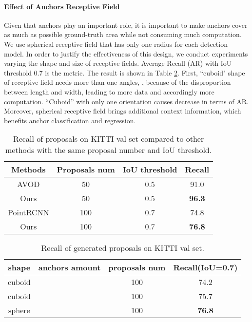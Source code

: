 \documentclass[10pt,twocolumn,letterpaper]{article}
\begin{document}
\paragraph{Effect of Anchors Receptive Field}
Given that anchors play an important role, it is important to make anchors cover as much as possible ground-truth area while not consuming much computation. We use spherical receptive field that has only one radius for each detection model. In order to justify the effectiveness of this design, we conduct  experiments varying the shape and size of receptive fields. Average Recall (AR) with IoU threshold 0.7 is the metric. The result is shown in Table \ref{tab:whether_sphere}. First, ``cuboid" shape of receptive field needs more than one angles, \ie , because of the disproportion between length and width, leading to  more data and accordingly more computation. ``Cuboid'' with only one orientation causes  decrease in terms of AR. Moreover, spherical receptive field brings additional context information, which benefits anchor classification and regression.

\begin{table}[t]
   \centering \addtolength{\tabcolsep}{-1pt}
   \footnotesize
   \begin{tabular}{|c|c|c|c|}
       \hline
       Methods & Proposals num & IoU threshold & Recall\\
       \hline
       AVOD \cite{AVOD} & 50 & 0.5 & 91.0 \\
       Ours & 50 & 0.5 & \bf 96.3 \\
       \hline
       PointRCNN \cite{shi2018pointrcnn} & 100 & 0.7 & 74.8 \\
       Ours & 100 & 0.7 & \bf 76.8 \\
      \hline
   \end{tabular}\vspace{0.1cm}
   \caption{Recall of proposals on KITTI val set compared to other methods with the same proposal number and IoU threshold.}
   \label{tab:whether_proposal}
\end{table}

\begin{table}[t]
   \centering \addtolength{\tabcolsep}{-1pt}
   \footnotesize
   \begin{tabular}{|c|c|c|c|}
       \hline
       shape & anchors amount & proposals num & Recall(IoU=0.7) \\
       \hline
       cuboid &  & 100 & 74.2 \\
       cuboid &  & 100 & 75.7 \\
       sphere &  & 100 & \bf 76.8 \\
      \hline
   \end{tabular}\vspace{0.1cm}
   \caption{Recall of generated proposals on KITTI val set.}
   \label{tab:whether_sphere}
\end{table}
\end{document}

